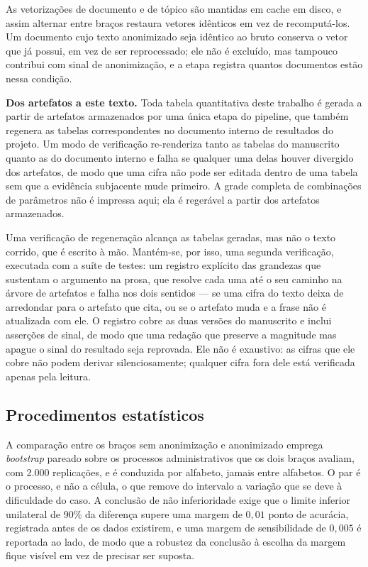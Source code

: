 As vetorizações de documento e de tópico são mantidas em cache em disco, e assim alternar entre
braços restaura vetores idênticos em vez de recomputá-los. Um documento cujo texto anonimizado seja
idêntico ao bruto conserva o vetor que já possui, em vez de ser reprocessado; ele não é excluído,
mas tampouco contribui com sinal de anonimização, e a etapa registra quantos documentos estão nessa
condição.

\textbf{Dos artefatos a este texto.} Toda tabela quantitativa deste trabalho é gerada a partir de
artefatos armazenados por uma única etapa do pipeline, que também regenera as tabelas
correspondentes no documento interno de resultados do projeto. Um modo de verificação re-renderiza
tanto as tabelas do manuscrito quanto as do documento interno e falha se qualquer uma delas houver
divergido dos artefatos, de modo que uma cifra não pode ser editada dentro de uma tabela sem que a
evidência subjacente mude primeiro. A grade completa de combinações de parâmetros não é impressa
aqui; ela é regerável a partir dos artefatos armazenados.

Uma verificação de regeneração alcança as tabelas geradas, mas não o texto corrido, que é
escrito à mão. Mantém-se, por isso, uma segunda verificação, executada com a suíte de testes:
um registro explícito das grandezas que sustentam o argumento na prosa, que resolve cada uma
até o seu caminho na árvore de artefatos e falha nos dois sentidos --- se uma cifra do texto
deixa de arredondar para o artefato que cita, ou se o artefato muda e a frase não é atualizada
com ele. O registro cobre as duas versões do manuscrito e inclui asserções de sinal, de modo
que uma redação que preserve a magnitude mas apague o sinal do resultado seja reprovada. Ele não é
exaustivo: as cifras que ele cobre não podem derivar silenciosamente; qualquer cifra fora dele
está verificada apenas pela leitura.

\subsection{Procedimentos estatísticos}\label{sec:estatistica}

A comparação entre os braços sem anonimização e anonimizado emprega \emph{bootstrap} pareado sobre os processos
administrativos que os dois braços avaliam, com 2.000 replicações, e é conduzida por alfabeto,
jamais entre alfabetos. O par é o processo, e não a célula, o que remove do intervalo a variação
que se deve à dificuldade do caso. A conclusão de não inferioridade exige que o limite inferior
unilateral de 90\% da diferença supere uma margem de $0{,}01$ ponto de acurácia, registrada antes
de os dados existirem, e uma margem de sensibilidade de $0{,}005$ é reportada ao lado, de modo que
a robustez da conclusão à escolha da margem fique visível em vez de precisar ser suposta.

